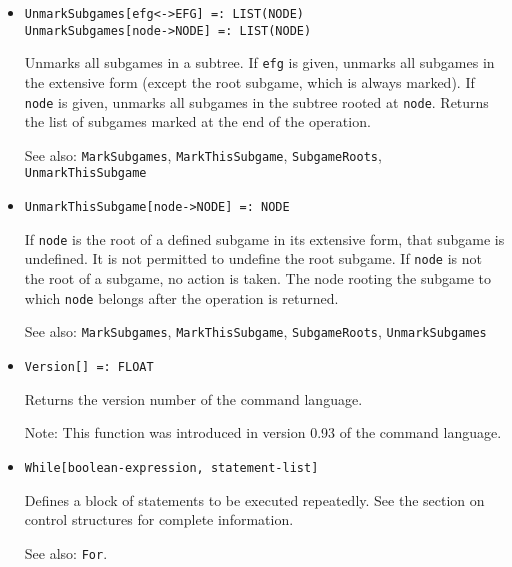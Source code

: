 \begin{itemize}
\item
\protect \large \begin{verbatim}
UnmarkSubgames[efg<->EFG] =: LIST(NODE)
UnmarkSubgames[node->NODE] =: LIST(NODE)
\end{verbatim}\normalsize

\bd
Unmarks all subgames in a subtree.  If \verb+efg+ is given, unmarks all
subgames in the extensive form (except the root subgame, which is always
marked).  If \verb+node+ is given, unmarks all subgames in the subtree
rooted at \verb+node+.  Returns the list of subgames marked at the
end of the operation.
\item
[See also:] {\tt MarkSubgames}, {\tt MarkThisSubgame}, {\tt SubgameRoots},
{\tt UnmarkThisSubgame}
\ed

\item
\protect \large \begin{verbatim}
UnmarkThisSubgame[node->NODE] =: NODE
\end{verbatim}\normalsize

\bd
If \verb+node+ is the root of a defined subgame in its extensive form,
that subgame is undefined.  It is not permitted to undefine the root
subgame.  If \verb+node+ is not the root of a subgame, no action is
taken.  The node rooting the subgame to which \verb+node+ belongs after
the operation is returned.
\item
[See also:] {\tt MarkSubgames}, {\tt MarkThisSubgame}, {\tt SubgameRoots},
{\tt UnmarkSubgames}
\ed


\item
\protect \large \begin{verbatim}
Version[] =: FLOAT
\end{verbatim} \normalsize

\bd
Returns the version number of the command language.
\item
[Note:] This function was introduced in version 0.93 of the command language.
\ed


\item 
\protect \large \begin{verbatim}
While[boolean-expression, statement-list]
\end{verbatim} \normalsize
  
\bd
Defines a block of statements to be executed repeatedly.
See the section on control structures for complete information.
\item
[See also:] \verb+For+.
\ed


\end{itemize}
